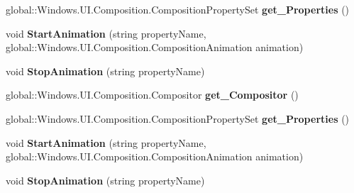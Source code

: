 \begin{DoxyCompactItemize}
\item 
\mbox{\label{interface_windows_1_1_u_i_1_1_composition_1_1_i_composition_object_a8b4cd5d3437e00c9e5b1e2533c068496}} 
global\+::\+Windows.\+U\+I.\+Composition.\+Composition\+Property\+Set {\bfseries get\+\_\+\+Properties} ()
\item 
\mbox{\label{interface_windows_1_1_u_i_1_1_composition_1_1_i_composition_object_a088c63d6d52d35264dd7c45af14b2c2b}} 
void {\bfseries Start\+Animation} (string property\+Name, global\+::\+Windows.\+U\+I.\+Composition.\+Composition\+Animation animation)
\item 
\mbox{\label{interface_windows_1_1_u_i_1_1_composition_1_1_i_composition_object_a3e0870776b613990ed3b7aeb31408e88}} 
void {\bfseries Stop\+Animation} (string property\+Name)
\item 
\mbox{\label{interface_windows_1_1_u_i_1_1_composition_1_1_i_composition_object_a61c8be4943d7e05e28090025b57637b8}} 
global\+::\+Windows.\+U\+I.\+Composition.\+Compositor {\bfseries get\+\_\+\+Compositor} ()
\item 
\mbox{\label{interface_windows_1_1_u_i_1_1_composition_1_1_i_composition_object_a8b4cd5d3437e00c9e5b1e2533c068496}} 
global\+::\+Windows.\+U\+I.\+Composition.\+Composition\+Property\+Set {\bfseries get\+\_\+\+Properties} ()
\item 
\mbox{\label{interface_windows_1_1_u_i_1_1_composition_1_1_i_composition_object_a088c63d6d52d35264dd7c45af14b2c2b}} 
void {\bfseries Start\+Animation} (string property\+Name, global\+::\+Windows.\+U\+I.\+Composition.\+Composition\+Animation animation)
\item 
\mbox{\label{interface_windows_1_1_u_i_1_1_composition_1_1_i_composition_object_a3e0870776b613990ed3b7aeb31408e88}} 
void {\bfseries Stop\+Animation} (string property\+Name)

\end{DoxyCompactItemize}
